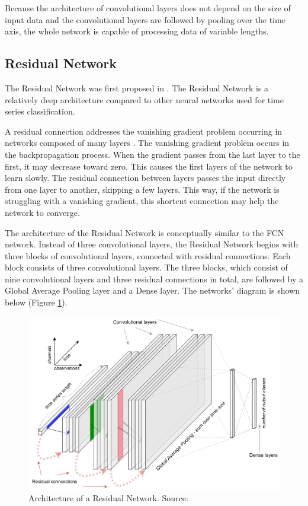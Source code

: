 \documentclass[a4paper,11pt,twoside]{report}
\theoremstyle{definition}
\begin{document}
\FloatBarrier

Because the architecture of convolutional layers does not depend on the size of input data and the convolutional layers are followed by pooling over the time axis, the whole network is capable of processing data of variable lengths.
\subsection{Residual Network}
The Residual Network was first proposed in \cite{residual}. The Residual Network is a relatively deep architecture compared to other neural networks used for time series classification.

A residual connection addresses the vanishing gradient problem occurring in networks composed of many layers \cite{residual}. The vanishing gradient problem occurs in the backpropagation process. When the gradient passes from the last layer to the first, it may decrease toward zero. This causes the first layers of the network to learn slowly. The residual connection between layers passes the input directly from one layer to another, skipping a few layers. This way, if the network is struggling with a vanishing gradient, this shortcut connection may help the network to converge.

The architecture of the Residual Network is conceptually similar to the FCN network. Instead of three convolutional layers, the Residual Network begins with three blocks of convolutional layers, connected with residual connections. Each block consists of three convolutional layers. The three blocks, which consist of nine convolutional layers and three residual connections in total, are followed by a Global Average Pooling layer and a Dense layer. The networks' diagram is shown below (Figure \ref{fig:Resnet_img}).


\FloatBarrier

\begin{figure}[h!]
\centering
\includegraphics[width=15.5cm]{imgs/resnet.png}
\caption{Architecture of a Residual Network. Source: \cite{dl_tsc}}
\label{fig:Resnet_img}
\end{figure}
\end{document}
